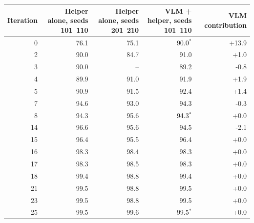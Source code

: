 \begin{tabular}{@{}rrrrr@{}}
\toprule
Iteration & Helper alone, seeds 101--110 & Helper alone, seeds 201--210 & VLM + helper, seeds 101--110 & VLM contribution \\
\midrule
0 & 76.1 & 75.1 & 90.0$^*$ & +13.9 \\
2 & 90.0 & 84.7 & 91.0 & +1.0 \\
3 & 90.0 & -- & 89.2 & -0.8 \\
4 & 89.9 & 91.0 & 91.9 & +1.9 \\
5 & 90.9 & 91.5 & 92.4 & +1.4 \\
7 & 94.6 & 93.0 & 94.3 & -0.3 \\
8 & 94.3 & 95.6 & 94.3$^*$ & +0.0 \\
14 & 96.6 & 95.6 & 94.5 & -2.1 \\
15 & 96.4 & 95.5 & 96.4 & +0.0 \\
16 & 98.3 & 98.4 & 98.3 & +0.0 \\
17 & 98.3 & 98.5 & 98.3 & +0.0 \\
18 & 99.4 & 98.8 & 99.4 & +0.0 \\
21 & 99.5 & 98.8 & 99.5 & +0.0 \\
23 & 99.5 & 98.8 & 99.5 & +0.0 \\
25 & 99.5 & 99.6 & 99.5$^*$ & +0.0 \\
\bottomrule
\end{tabular}
